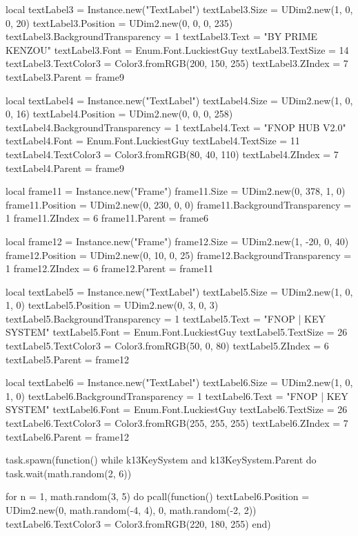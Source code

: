   local textLabel3 = Instance.new("TextLabel")
  textLabel3.Size = UDim2.new(1, 0, 0, 20)
  textLabel3.Position = UDim2.new(0, 0, 0, 235)
  textLabel3.BackgroundTransparency = 1
  textLabel3.Text = "BY PRIME KENZOU"
  textLabel3.Font = Enum.Font.LuckiestGuy
  textLabel3.TextSize = 14
  textLabel3.TextColor3 = Color3.fromRGB(200, 150, 255)
  textLabel3.ZIndex = 7
  textLabel3.Parent = frame9

  local textLabel4 = Instance.new("TextLabel")
  textLabel4.Size = UDim2.new(1, 0, 0, 16)
  textLabel4.Position = UDim2.new(0, 0, 0, 258)
  textLabel4.BackgroundTransparency = 1
  textLabel4.Text = "FNOP HUB V2.0"
  textLabel4.Font = Enum.Font.LuckiestGuy
  textLabel4.TextSize = 11
  textLabel4.TextColor3 = Color3.fromRGB(80, 40, 110)
  textLabel4.ZIndex = 7
  textLabel4.Parent = frame9

  local frame11 = Instance.new("Frame")
  frame11.Size = UDim2.new(0, 378, 1, 0)
  frame11.Position = UDim2.new(0, 230, 0, 0)
  frame11.BackgroundTransparency = 1
  frame11.ZIndex = 6
  frame11.Parent = frame6

  local frame12 = Instance.new("Frame")
  frame12.Size = UDim2.new(1, -20, 0, 40)
  frame12.Position = UDim2.new(0, 10, 0, 25)
  frame12.BackgroundTransparency = 1
  frame12.ZIndex = 6
  frame12.Parent = frame11

  local textLabel5 = Instance.new("TextLabel")
  textLabel5.Size = UDim2.new(1, 0, 1, 0)
  textLabel5.Position = UDim2.new(0, 3, 0, 3)
  textLabel5.BackgroundTransparency = 1
  textLabel5.Text = "FNOP | KEY SYSTEM"
  textLabel5.Font = Enum.Font.LuckiestGuy
  textLabel5.TextSize = 26
  textLabel5.TextColor3 = Color3.fromRGB(50, 0, 80)
  textLabel5.ZIndex = 6
  textLabel5.Parent = frame12

  local textLabel6 = Instance.new("TextLabel")
  textLabel6.Size = UDim2.new(1, 0, 1, 0)
  textLabel6.BackgroundTransparency = 1
  textLabel6.Text = "FNOP | KEY SYSTEM"
  textLabel6.Font = Enum.Font.LuckiestGuy
  textLabel6.TextSize = 26
  textLabel6.TextColor3 = Color3.fromRGB(255, 255, 255)
  textLabel6.ZIndex = 7
  textLabel6.Parent = frame12

  task.spawn(function()
    while k13KeySystem and k13KeySystem.Parent do
      task.wait(math.random(2, 6))

      for n = 1, math.random(3, 5) do
        pcall(function()
          textLabel6.Position = UDim2.new(0, math.random(-4, 4), 0, math.random(-2, 2))
          textLabel6.TextColor3 = Color3.fromRGB(220, 180, 255)
        end)

